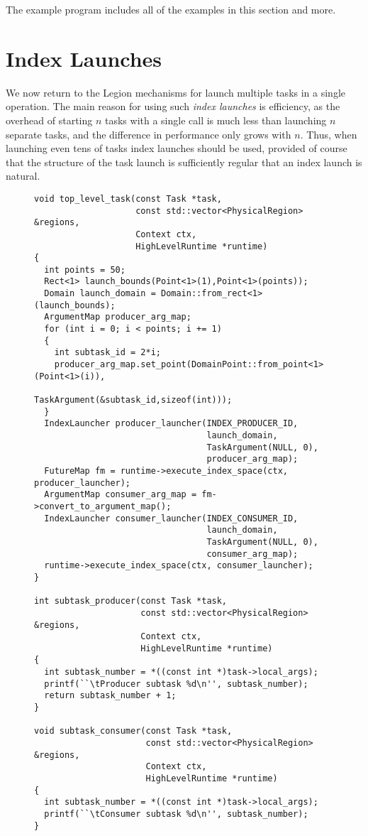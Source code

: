 The example program  includes all of the examples in this section and more.

\section{Index Launches}
\label{sec:indexlaunch}

We now return to the Legion mechanisms for launch multiple tasks in a
single operation.  The main reason for using such {\em index launches}
is efficiency, as the overhead of starting $n$ tasks with a single
call is much less than launching $n$ separate tasks, and the
difference in performance only grows with $n$.  Thus, when launching
even tens of tasks index launches should be used, provided of course
that the structure of the task launch is sufficiently regular that an
index launch is natural.

\begin{figure}
{\small
\begin{lstlisting}
void top_level_task(const Task *task,
                    const std::vector<PhysicalRegion> &regions,
                    Context ctx,
                    HighLevelRuntime *runtime)
{
  int points = 50;
  Rect<1> launch_bounds(Point<1>(1),Point<1>(points));
  Domain launch_domain = Domain::from_rect<1>(launch_bounds);
  ArgumentMap producer_arg_map;
  for (int i = 0; i < points; i += 1)
  {
    int subtask_id = 2*i;
    producer_arg_map.set_point(DomainPoint::from_point<1>(Point<1>(i)),
                               TaskArgument(&subtask_id,sizeof(int)));
  }
  IndexLauncher producer_launcher(INDEX_PRODUCER_ID,
                                  launch_domain,
                                  TaskArgument(NULL, 0),
                                  producer_arg_map);
  FutureMap fm = runtime->execute_index_space(ctx, producer_launcher);
  ArgumentMap consumer_arg_map = fm->convert_to_argument_map();
  IndexLauncher consumer_launcher(INDEX_CONSUMER_ID,
                                  launch_domain,
                                  TaskArgument(NULL, 0),
                                  consumer_arg_map);
  runtime->execute_index_space(ctx, consumer_launcher);
}

int subtask_producer(const Task *task,
                     const std::vector<PhysicalRegion> &regions,
                     Context ctx,
                     HighLevelRuntime *runtime)
{
  int subtask_number = *((const int *)task->local_args);
  printf(``\tProducer subtask %d\n'', subtask_number);
  return subtask_number + 1;
}

void subtask_consumer(const Task *task,
                      const std::vector<PhysicalRegion> &regions,
                      Context ctx,
                      HighLevelRuntime *runtime)
{
  int subtask_number = *((const int *)task->local_args);
  printf(``\tConsumer subtask %d\n'', subtask_number);
}
\end{lstlisting}
}
\caption{}
\label{fig:indexlaunch}
\end{figure}


